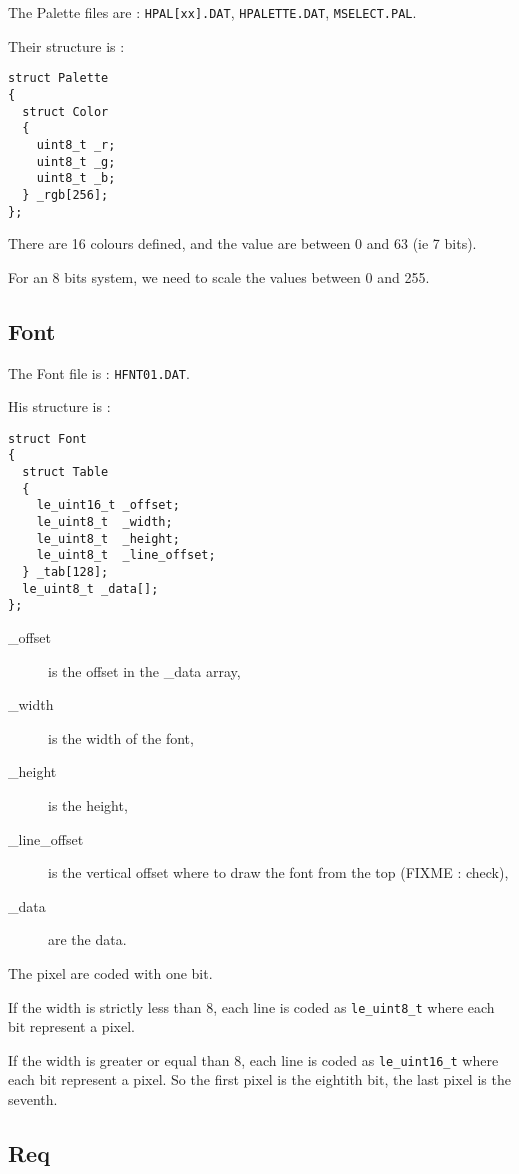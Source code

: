 \documentclass[a4paper,twoside,12pt,dvips]{article}
\begin{document}
The Palette files are : \texttt{HPAL[xx].DAT}, \texttt{HPALETTE.DAT}, \texttt{MSELECT.PAL}.

Their structure is :

\begin{lstlisting}
struct Palette
{
  struct Color
  {
    uint8_t _r;
    uint8_t _g;
    uint8_t _b;
  } _rgb[256];
};
\end{lstlisting}

There are 16 colours defined, and the value are between 0 and 63 (ie 7 bits).

For an 8 bits system, we need to scale the values between 0 and 255.

\subsection{Font}
\label{sec:font}

The Font file is : \texttt{HFNT01.DAT}.

His structure is :

\begin{lstlisting}
struct Font
{
  struct Table
  {
    le_uint16_t _offset;
    le_uint8_t  _width;
    le_uint8_t  _height;
    le_uint8_t  _line_offset;
  } _tab[128];
  le_uint8_t _data[];
};
\end{lstlisting}

\begin{description}
\item[\_offset] is the offset in the \_data array,
\item[\_width] is the width of the font,
\item[\_height] is the height,
\item[\_line\_offset] is the vertical offset where to draw the font from the top (FIXME : check),
\item[\_data] are the data.
\end{description}

The pixel are coded with one bit. 

If the width is strictly less than 8, each line is coded as \texttt{le\_uint8\_t} where each bit represent a pixel. 

If the width is greater or equal than 8, each line is coded as \texttt{le\_uint16\_t} where each bit represent a pixel. So the first pixel is the eightith bit, the last pixel is the seventh. 

\subsection{Req}
\label{sec:req}
\end{document}

